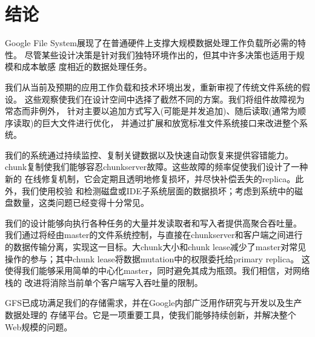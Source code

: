 \section{结论}

Google File System展现了在普通硬件上支撑大规模数据处理工作负载所必需的特性。
尽管某些设计决策是针对我们独特环境作出的，但其中许多决策也适用于规模和成本敏感
度相近的数据处理任务。


我们从当前及预期的应用工作负载和技术环境出发，重新审视了传统文件系统的假设。
这些观察使我们在设计空间中选择了截然不同的方案。我们将组件故障视为常态而非例外，
针对主要以追加方式写入(可能是并发追加)、随后读取(通常为顺序读取)的巨大文件进行优化，
并通过扩展和放宽标准文件系统接口来改进整个系统。

我们的系统通过持续监控、复制关键数据以及快速自动恢复来提供容错能力。
chunk复制使我们能够容忍chunkserver故障。这些故障的频率促使我们设计了一种新的
在线修复机制，它会定期且透明地修复损坏，并尽快补偿丢失的replica。此外，我们使用校验
和检测磁盘或IDE子系统层面的数据损坏；考虑到系统中的磁盘数量，这类问题已经变得十分常见。

我们的设计能够向执行各种任务的大量并发读取者和写入者提供高聚合吞吐量。
我们通过将经由master的文件系统控制，与直接在chunkserver和客户端之间进行
的数据传输分离，实现这一目标。大chunk大小和chunk lease减少了master对常见
操作的参与；其中chunk lease将数据mutation中的权限委托给primary replica。
这使得我们能够采用简单的中心化master，同时避免其成为瓶颈。我们相信，对网络栈的
改进将消除当前单个客户端写入吞吐量的限制。

GFS已成功满足我们的存储需求，并在Google内部广泛用作研究与开发以及生产数据处理的
存储平台。它是一项重要工具，使我们能够持续创新，并解决整个Web规模的问题。
